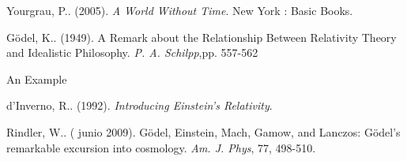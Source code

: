 \documentclass[11pt]{book}
\begin{document}




 \begin{thebibliography}{99}
  Yourgrau, P.. (2005). \emph{A World Without Time}. New York %
 : Basic Books.
 
  Gödel, K.. (1949). A Remark about the Relationship Between Relativity Theory and Idealistic Philosophy. \emph{P. A. Schilpp},pp. 557-562
 
  An Example

 
  d'Inverno, R.. (1992). \emph{Introducing Einstein's Relativity}. 
 
  Rindler, W.. ( junio 2009). Gödel, Einstein, Mach, Gamow, and Lanczos: Gödel’s remarkable excursion into cosmology. \emph{Am. J. Phys}, 77, 498-510.
 
 
 \end{thebibliography}
 
\end{document}
